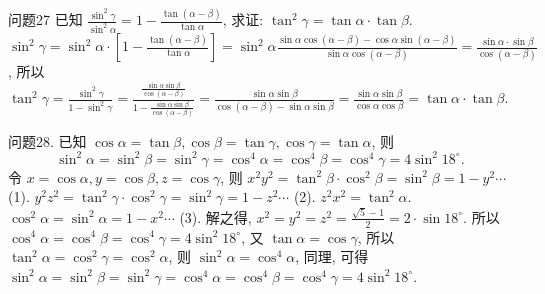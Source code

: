 问题27 已知 $\frac{\sin ^2 \gamma}{\sin ^2 \alpha}=1-\frac{\tan (\alpha-\beta)}{\tan \alpha}$, 求证: $\tan ^2 \gamma=\tan \alpha \cdot \tan \beta$.
$\sin ^2 \gamma=\sin ^2 \alpha \cdot\left[1-\frac{\tan (\alpha-\beta)}{\tan \alpha}\right]=\sin ^2 \alpha \frac{\sin \alpha \cos (\alpha-\beta)-\cos \alpha \sin (\alpha-\beta)}{\sin \alpha \cos (\alpha-\beta)}= \frac{\sin \alpha \cdot \sin \beta}{\cos (\alpha-\beta)}$, 所以 $\tan ^2 \gamma=\frac{\sin ^2 \gamma}{1-\sin ^2 \gamma}=\frac{\frac{\sin \alpha \sin \beta}{\cos (\alpha-\beta)}}{1-\frac{\sin \alpha \sin \beta}{\cos (\alpha-\beta)}}=\frac{\sin \alpha \sin \beta}{\cos (\alpha-\beta)-\sin \alpha \sin \beta}= \frac{\sin \alpha \sin \beta}{\cos \alpha \cos \beta}=\tan \alpha \cdot \tan \beta$.



问题28. 已知 $\cos \alpha=\tan \beta, \cos \beta=\tan \gamma, \cos \gamma=\tan \alpha$, 则
$$
\sin ^2 \alpha=\sin ^2 \beta=\sin ^2 \gamma=\cos ^4 \alpha=\cos ^4 \beta=\cos ^4 \gamma=4 \sin ^2 18^{\circ} .
$$
令 $x=\cos \alpha, y=\cos \beta, z=\cos \gamma$, 则 $x^2 y^2=\tan ^2 \beta \cdot \cos ^2 \beta=\sin ^2 \beta= 1-y^2 \cdots$ (1). $y^2 z^2=\tan ^2 \gamma \cdot \cos ^2 \gamma=\sin ^2 \gamma=1-z^2 \cdots$ (2). $z^2 x^2=\tan ^2 \alpha$. $\cos ^2 \alpha=\sin ^2 \alpha=1-x^2 \cdots$ (3). 解之得, $x^2=y^2=z^2=\frac{\sqrt{5}-1}{2}=2 \cdot \sin 18^{\circ}$. 所以 $\cos ^4 \alpha=\cos ^4 \beta=\cos ^4 \gamma=4 \sin ^2 18^{\circ}$, 又 $\tan \alpha=\cos \gamma$, 所以 $\tan ^2 \alpha=\cos ^2 \gamma= \cos ^2 \alpha$, 则 $\sin ^2 \alpha=\cos ^4 \alpha$, 同理, 可得 $\sin ^2 \alpha=\sin ^2 \beta=\sin ^2 \gamma=\cos ^4 \alpha=\cos ^4 \beta= \cos ^4 \gamma=4 \sin ^2 18^{\circ}$.


